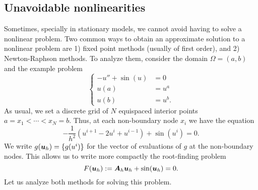 \documentclass{article}
\renewcommand{\vec}{\vectorsym}
\newcommand{\mat}{\matrixsym}
\begin{document}
\subsection{Unavoidable nonlinearities}
Sometimes, specially in stationary models, we cannot avoid having to solve a nonlinear problem. Two common ways to obtain an approximate solution to a nonlinear problem are 1) fixed point methods (usually of first order), and 2) Newton-Raphson methods. To analyze them, consider the domain $\Omega=(a,b)$ and the example problem
$$
\begin{cases}
    -u'' + \sin(u) &= 0\\
    u(a) &= u^a\\
    u(b) &= u^b.
\end{cases}
$$
As usual, we set a discrete grid of $N$ equispaced interior points $a=x_1<\cdots<x_N=b$. Thus, at each non-boundary node $x_i$ we have the equation
$$
-\frac{1}{h^2}(u^{i+1}-2u^i+u^{i-1}) + \sin(u^i) = 0.
$$
We write $g(\vec u_h) = \{g(u^i)\}$ for the vector of evaluations of $g$ at the non-boundary nodes. This allows us to write more compactly the root-finding problem
$$F(\vec u_h):= \mat A_h \vec u_h + \sin(\vec u_h) = 0.$$
Let us analyze both methods for solving this problem.
\end{document}
